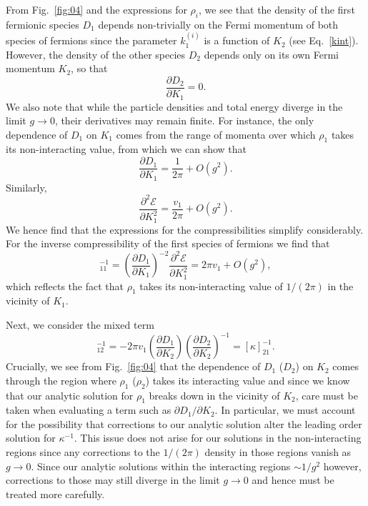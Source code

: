 \documentclass[aps,pra,
superscriptaddress,
reprint,twocolumn,preprintnumbers,
amsmath,amssymb,
nofootinbib]{revtex4-1}
\newcommand{\beq}{\begin{equation}}
\newcommand{\eeq}{\end{equation}}
\newcommand{\p}{\partial}
\begin{document}
From Fig.~\ref{fig:04} and the expressions for $\rho_i$, we see that the density of the first fermionic species $D_1$ depends non-trivially on the Fermi momentum of both species of fermions since the parameter $k_1^{(i)}$ is a function of $K_2$ (see Eq.~\eqref{kint}). However, the density of the other species $D_2$ depends only on its own Fermi momentum $K_2$, so that 
	\beq
	\frac{\p D_2}{\p K_1} = 0.
	\eeq	
We also note that while the particle densities and total energy diverge in the limit $g \to 0$, their derivatives may remain finite. For instance, the only dependence of $D_1$ on $K_1$ comes from the range of momenta over which $\rho_1$ takes its non-interacting value, from which we can show that 
	\beq
	\frac{\p D_1}{\p K_1} = \frac{1}{2 \pi} + O(g^2).
	\eeq  
Similarly,	
	\beq
	\frac{\p^2 \mathcal{E}}{\p K_1^2} = \frac{v_1}{2 \pi} + O(g^2).
	\eeq
We hence find that the expressions for the compressibilities simplify considerably. For the inverse compressibility of the first species of fermions we find that 
	\beq
	[\kappa]_{11}^{-1} = \left( \frac{\partial D_1}{\partial K_1}\right)^{-2} \frac{\partial^2 \mathcal{E}}{\partial K_1^2} = 2 \pi v_1 + O(g^2),
	\eeq
which reflects the fact that $\rho_1$ takes its non-interacting value of $1/(2\pi)$ in the vicinity of $K_1$.
	
Next, we consider the mixed term	
	\beq
	[\kappa]_{12}^{-1} = -2 \pi v_1 \left(\frac{\p D_1}{\p K_2} \right) \left(\frac{\p D_2}{\p K_2} \right)^{-1} = [\kappa]_{21}^{-1}.
	\eeq
Crucially, we see from Fig.~\ref{fig:04} that the dependence of $D_1$ ($D_2$) on $K_2$ comes through the region where $\rho_1$ ($\rho_2$) takes its interacting value and since we know that our analytic solution for $\rho_1$ breaks down in the vicinity of $K_2$, care must be taken when evaluating a term such as $\p D_1/\p K_2$. In particular, we must account for the possibility that corrections to our analytic solution alter the leading order solution for $\kappa^{-1}$. This issue does not arise for our solutions in the non-interacting regions since any corrections to the $1/(2\pi)$ density in those regions vanish as $g\to 0$. Since our analytic solutions within the interacting regions $\sim 1/g^2$ however, corrections to those may still diverge in the limit $g\to 0$ and hence must be treated more carefully.
	
\end{document}
